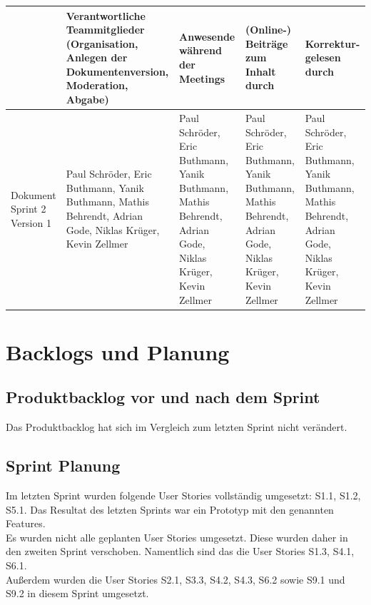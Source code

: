 \documentclass[a4paper,11pt]{article}
\begin{document}
\begin{table}[h]
	\centering
	\footnotesize
	\begin{tabular}{| p{1.5cm} | p{2.5cm} | p{2cm} | p{2cm} | p{2cm} |}
		\hline
		                            & Verantwortliche Teammitglieder (Organisation, Anlegen der Dokumentenversion, Moderation, Abgabe)         & Anwesende während der Meetings                                                                           & (Online-) Beiträge zum Inhalt durch                                                                      & Korrektur-gelesen durch                                                                                  \\
		\hline
		Dokument Sprint 2 Version 1 & Paul Schröder, Eric Buthmann, Yanik Buthmann, Mathis Behrendt, Adrian Gode, Niklas Krüger, Kevin Zellmer & Paul Schröder, Eric Buthmann, Yanik Buthmann, Mathis Behrendt, Adrian Gode, Niklas Krüger, Kevin Zellmer & Paul Schröder, Eric Buthmann, Yanik Buthmann, Mathis Behrendt, Adrian Gode, Niklas Krüger, Kevin Zellmer & Paul Schröder, Eric Buthmann, Yanik Buthmann, Mathis Behrendt, Adrian Gode, Niklas Krüger, Kevin Zellmer \\
		\hline
	\end{tabular}
\end{table}

\section{Backlogs und Planung}

\subsection{Produktbacklog vor und nach dem Sprint}
Das Produktbacklog hat sich im Vergleich zum letzten Sprint nicht verändert.\\

\subsection{Sprint Planung}

Im letzten Sprint wurden folgende  User Stories vollständig umgesetzt: S1.1, S1.2, S5.1.
Das Resultat des letzten Sprints war ein Prototyp mit den genannten Features.\\
Es wurden nicht alle geplanten User Stories umgesetzt.
Diese wurden daher in den zweiten Sprint verschoben.
Namentlich sind das die User Stories S1.3, S4.1, S6.1.\\
Außerdem wurden die User Stories S2.1, S3.3, S4.2, S4.3, S6.2 sowie S9.1 und S9.2 in diesem Sprint umgesetzt.\\
\end{document}
